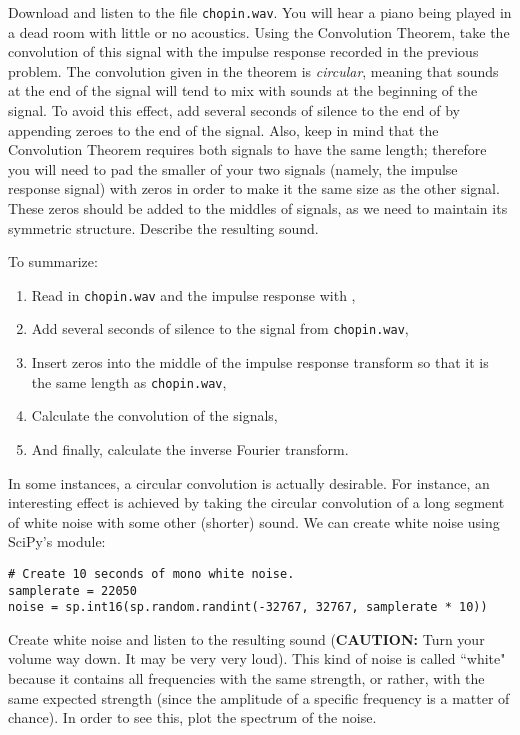 \begin{problem}\label{convolution_problem}
Download and listen to the file \texttt{chopin.wav}.
You will hear a piano being played in a dead room with little or no acoustics.
Using the Convolution Theorem, take the convolution of this signal with the impulse response recorded in the previous problem.
The convolution given in the theorem is \emph{circular}, meaning that sounds at the end of the signal will tend to mix with sounds at the beginning of the signal.
To avoid this effect, add several seconds of silence to the end of  by appending zeroes to the end of the signal.
Also, keep in mind that the Convolution Theorem requires both signals to have the same length; therefore you will need to pad the smaller of your two signals (namely, the impulse response signal) with zeros in order to make it the same size as the other signal.
These zeros should be added to the middles of signals, as we need to maintain its symmetric structure.
Describe the resulting sound.

To summarize:
\begin{enumerate}

\item Read in \texttt{chopin.wav} and the impulse response with ,
\item Add several seconds of silence to the signal from \texttt{chopin.wav},
\item Insert zeros into the middle of the impulse response transform so that it is the same length as  \texttt{chopin.wav},
\item Calculate the convolution of the signals,
\item And finally, calculate the inverse Fourier transform.
\end{enumerate}

\end{problem}

In some instances, a circular convolution is actually desirable.
For instance, an interesting effect is achieved by taking the circular convolution of a long segment of white noise with some other (shorter) sound.
We can create white noise using SciPy's  module:
\begin{lstlisting}
# Create 10 seconds of mono white noise.
samplerate = 22050
noise = sp.int16(sp.random.randint(-32767, 32767, samplerate * 10))
\end{lstlisting}

\begin{problem}
Create white noise and listen to the resulting sound (\textbf{CAUTION:} Turn your volume way down. It may be very very loud).
This kind of noise is called ``white" because it contains all frequencies with the same strength, or rather, with the same expected strength (since the amplitude of a specific frequency is a matter of chance).
In order to see this, plot the spectrum of the noise.
\end{problem}

